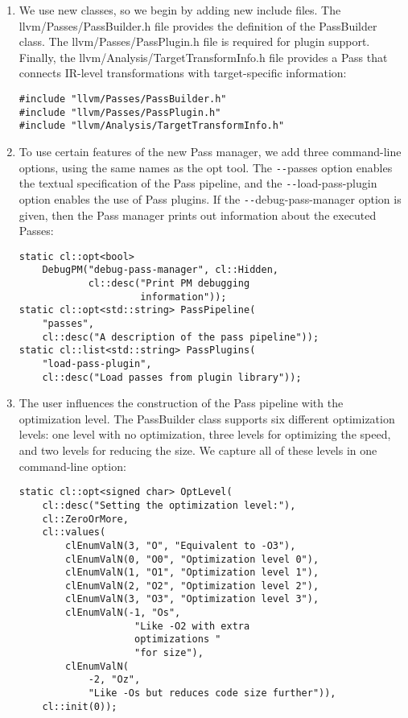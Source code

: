 \begin{enumerate}
\item We use new classes, so we begin by adding new include files. The llvm/Passes/PassBuilder.h file provides the definition of the PassBuilder class. The llvm/Passes/PassPlugin.h file is required for plugin support. Finally, the llvm/Analysis/TargetTransformInfo.h file provides a Pass that connects IR-level transformations with target-specific information:
\begin{lstlisting}[caption={}]
#include "llvm/Passes/PassBuilder.h"
#include "llvm/Passes/PassPlugin.h"
#include "llvm/Analysis/TargetTransformInfo.h"
\end{lstlisting}

\item To use certain features of the new Pass manager, we add three command-line options, using the same names as the opt tool. The \verb|--|passes option enables the textual specification of the Pass pipeline, and the \verb|--|load-pass-plugin option enables the use of Pass plugins. If the \verb|--|debug-pass-manager option is given, then the Pass manager prints out information about the executed Passes:
\begin{lstlisting}[caption={}]
static cl::opt<bool>
	DebugPM("debug-pass-manager", cl::Hidden,
			cl::desc("Print PM debugging 
					 information"));
static cl::opt<std::string> PassPipeline(
	"passes",
	cl::desc("A description of the pass pipeline"));
static cl::list<std::string> PassPlugins(
	"load-pass-plugin",
	cl::desc("Load passes from plugin library"));
\end{lstlisting}

\item The user influences the construction of the Pass pipeline with the optimization level. The PassBuilder class supports six different optimization levels: one level with no optimization, three levels for optimizing the speed, and two levels for reducing the size. We capture all of these levels in one command-line option:
\begin{lstlisting}[caption={}]
static cl::opt<signed char> OptLevel(
	cl::desc("Setting the optimization level:"),
	cl::ZeroOrMore,
	cl::values(
		clEnumValN(3, "O", "Equivalent to -O3"),
		clEnumValN(0, "O0", "Optimization level 0"),
		clEnumValN(1, "O1", "Optimization level 1"),
		clEnumValN(2, "O2", "Optimization level 2"),
		clEnumValN(3, "O3", "Optimization level 3"),
		clEnumValN(-1, "Os",
					"Like -O2 with extra 
					optimizations "
					"for size"),
		clEnumValN(
			-2, "Oz",
			"Like -Os but reduces code size further")),
	cl::init(0));
\end{lstlisting}


\end{enumerate}
